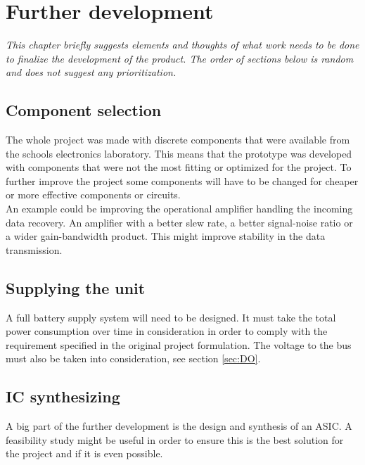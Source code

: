 \chapter{Further development}
\textit{This chapter briefly suggests elements and thoughts of what work needs to be done to finalize the development of the product. The order of sections below is random and does not suggest any prioritization.}

\section{Component selection}
The whole project was made with discrete components that were available from the schools electronics laboratory. This means that the prototype was developed with components that were not the most fitting or optimized for the project. To further improve the project some components will have to be changed for cheaper or more effective components or circuits. \\
An example could be improving the operational amplifier handling the incoming data recovery. An amplifier with a better slew rate, a better signal-noise ratio or a wider gain-bandwidth product. This might improve stability in the data transmission.
\section{Supplying the unit}
A full battery supply system will need to be designed. It must take the total power consumption over time in consideration in order to comply with the requirement specified in the original project formulation. The voltage to the bus must also be taken into consideration, see section \ref{sec:DO}.
\section{IC synthesizing}
A big part of the further development is the design and synthesis of an ASIC. A feasibility study might be useful in order to ensure this is the best solution for the project and if it is even possible. 
